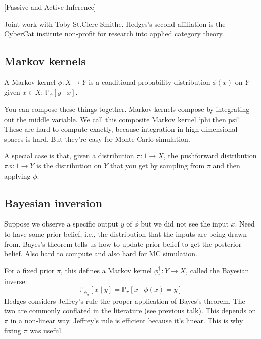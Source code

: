 [Passive and Active Inference]

\begin{affils}
\end{affils}

\newcommand{\period}{.}

Joint work with Toby St\period{}Clere Smithe.
Hedges's second affiliation is the CyberCat institute non-profit for research into
applied category theory.

\subsection*{Markov kernels}

A Markov kernel $\phi : X \to Y$ is a conditional probability distribution $\phi(x)$ on
$Y$ given $x \in X$: $\mathbb{P}_\phi\left[y \mid x\right]$.

You can compose these things together.
Markov kernels compose by integrating out the middle variable.
We call this composite Markov kernel `phi then psi'.
These are hard to compute exactly, because integration in high-dimensional spaces is
hard.
But they're easy for Monte-Carlo simulation.

A special case is that, given a distribution $\pi : 1 \to X$, the pushforward
distribution $\pi \phi : 1 \to Y$ is the distribution on $Y$ that you get by sampling
from $\pi$ and then applying $\phi$.

\subsection*{Bayesian inversion}

Suppose we observe a specific output $y$ of $\phi$ but we did not see the input $x$.
Need to have some prior belief, i.e., the distribution that the inputs are being drawn
from.
Bayes's theorem tells us how to update prior belief to get the posterior belief.
Also hard to compute and also hard for MC simulation.

For a fixed prior $\pi$, this defines a Markov kernel $\phi_\pi^\dagger : Y \to X$,
called the Bayesian inverse:
\begin{equation}
  \mathbb{P}_{\phi_\pi^\dagger} \left[ x \mid y \right] = \mathbb{P}_\pi \left[ x \mid \phi(x) = y \right]
\end{equation}
Hedges considers Jeffrey's rule the proper application of Bayes's theorem.
The two are commonly conflated in the literature (see previous talk).
This depends on $\pi$ in a non-linear way.
Jeffrey's rule is efficient because it's linear.
This is why fixing $\pi$ was useful.

